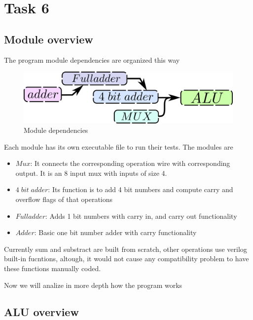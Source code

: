 
\section*{Task 6}

\subsection*{Module overview}
The program module dependencies are organized this way
\begin{figure}[H]
  \begin{centering}
  \includegraphics[scale=1]{data/modulos.png}
  \par\end{centering}
  \caption{Module dependencies}
\end{figure}
Each module has its own executable file to run their tests. The modules are

\begin{itemize}
  \item $Mux$: It connects the corresponding operation wire with corresponding output. It is an 8 input mux with inputs of size 4.
  \item $4\;bit\;adder$: Its function is to add 4 bit numbers and compute carry and overflow flags of that operations
  \item $Fulladder$: Adds 1 bit numbers with carry in, and carry out functionality
  \item $Adder $: Basic one bit number adder with carry functionality
\end{itemize}

Currently sum and substract are built from scratch, other operations use verilog built-in fucntions, altough, it would not cause any compatibility problem to have these functions manually coded.

Now we will analize in more depth how the program works

\subsection*{ALU overview}

